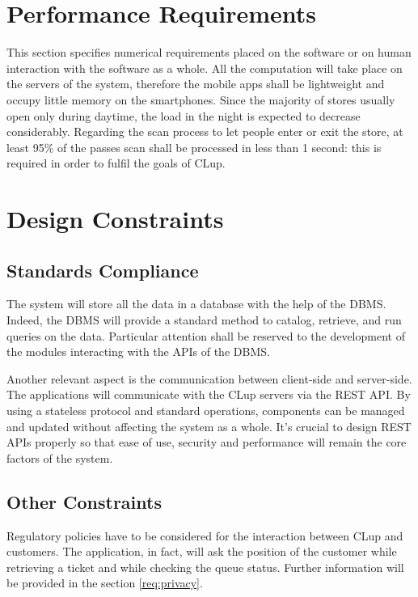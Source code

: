 \section{Performance Requirements}
This section specifies numerical requirements placed on the software or on human interaction with the software as a whole.\newline
All the computation will take place on the servers of the system, therefore the mobile apps shall be lightweight and occupy little memory on the smartphones.
Since the majority of stores usually open only during daytime, the load in the night is expected to decrease considerably.
Regarding the scan process to let people enter or exit the store, at least 95\% of the passes scan shall be processed in less than 1 second: this is required in order to fulfil the goals of CLup.

\section{Design Constraints}

\subsection{Standards Compliance}
The system will store all the data in a database with the help of the DBMS. Indeed, the DBMS will provide a standard method to catalog, retrieve, and run queries on the data. Particular attention shall be reserved to the development of the modules interacting with the APIs of the DBMS.

Another relevant aspect is the communication between client-side and server-side. The applications will communicate with the CLup servers via the REST API. By using a stateless protocol and standard operations, components can be managed and updated without affecting the system as a whole.\newline
It’s crucial to design REST APIs properly so that ease of use, security and performance will remain the core factors of the system.

\subsection{Other Constraints}
Regulatory policies have to be considered for the interaction between CLup and customers. The application, in fact, will ask the position of the customer while retrieving a ticket and while checking the queue status. Further information will be provided in the section \ref{req:privacy}.

